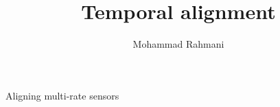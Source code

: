 \documentclass[a4paper]{article}
\title{Temporal alignment}
\date{}
\author{Mohammad Rahmani}
\begin{document}
\maketitle
    Aligning multi-rate sensors
    
    
\end{document}
